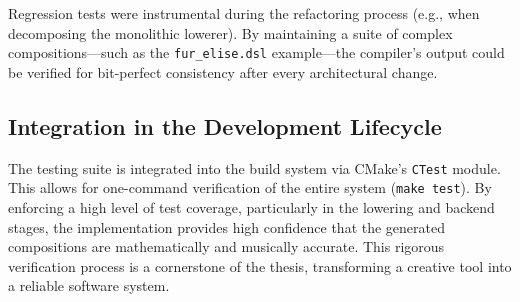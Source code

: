 Regression tests were instrumental during the refactoring process (e.g., when decomposing the monolithic lowerer).
By maintaining a suite of complex compositions—such as the \texttt{fur\_elise.dsl} example—the compiler's
output could be
verified for bit-perfect consistency after every architectural change.

\subsection{Integration in the Development Lifecycle}\label{subsec:integration-in-the-development-lifecycle}

The testing suite is integrated into the build system via CMake's \texttt{CTest} module.
This allows for one-command verification of the entire system (\texttt{make test}).
By enforcing a high level of test coverage, particularly in the lowering and backend stages, the implementation provides
high confidence that the generated compositions are mathematically and musically accurate.
This rigorous verification process is a cornerstone of the thesis, transforming a creative tool into a reliable software
system.
